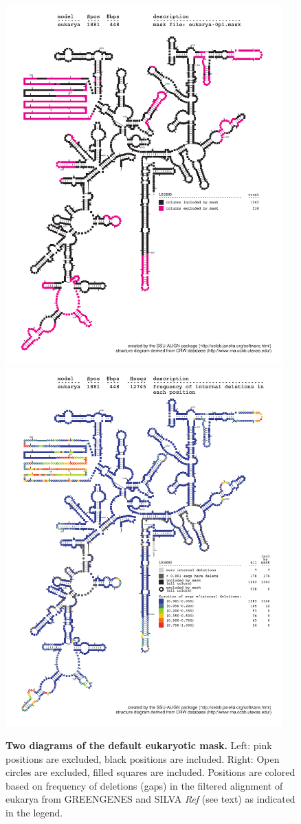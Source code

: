 \begin{figure}
  \begin{center}
\includegraphics[width=4.2in]{Figures/eukarya-0p1-mask}
\includegraphics[width=4.2in]{Figures/eukarya-ggsilR-dint-wmask}
  \end{center}
\caption{\textbf{Two diagrams of the default eukaryotic mask.} Left: pink positions are excluded,
  black positions are included. Right: Open circles are excluded,
  filled squares are included. Positions are colored based on
  frequency of deletions (gaps) in the filtered alignment of eukarya
  from GREENGENES and SILVA \emph{Ref} (see text) as
  indicated in the legend.}
\label{fig:mask-euk}
\end{figure}
